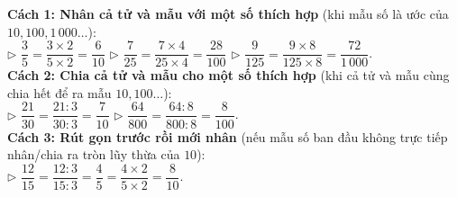 \documentclass[14pt,a4paper,oneside]{extbook}
\begin{document}
\vspace{3mm}

\noindent
\begin{tcolorbox}[
  enhanced,
  title={\footnotesize\bfseries\color{white}\faWrench\ 3. Cách chuyển một phân số thành phân số thập phân},
  colback=purple!2!white,
  colframe=purple!70!black,
  arc=2.5mm, boxrule=0.8pt, top=1.8mm, bottom=1.8mm, left=2.5mm, right=2.5mm
]
  \footnotesize
  \textbf{Cách 1: Nhân cả tử và mẫu với một số thích hợp} (khi mẫu số là ước của $10, 100, 1\,000\dots$):\\
  \quad $\triangleright$ $\dfrac{3}{5} = \dfrac{3 \times 2}{5 \times 2} = \dfrac{6}{10}$ \qquad $\triangleright$ $\dfrac{7}{25} = \dfrac{7 \times 4}{25 \times 4} = \dfrac{28}{100}$ \qquad $\triangleright$ $\dfrac{9}{125} = \dfrac{9 \times 8}{125 \times 8} = \dfrac{72}{1\,000}$.\\[2pt]
  \textbf{Cách 2: Chia cả tử và mẫu cho một số thích hợp} (khi cả tử và mẫu cùng chia hết để ra mẫu $10, 100\dots$):\\
  \quad $\triangleright$ $\dfrac{21}{30} = \dfrac{21 : 3}{30 : 3} = \dfrac{7}{10}$ \qquad $\triangleright$ $\dfrac{64}{800} = \dfrac{64 : 8}{800 : 8} = \dfrac{8}{100}$.\\[2pt]
  \textbf{Cách 3: Rút gọn trước rồi mới nhân} (nếu mẫu số ban đầu không trực tiếp nhân/chia ra tròn lũy thừa của $10$):\\
  \quad $\triangleright$ $\dfrac{12}{15} = \dfrac{12 : 3}{15 : 3} = \dfrac{4}{5} = \dfrac{4 \times 2}{5 \times 2} = \dfrac{8}{10}$.
\end{tcolorbox}

\vspace{3mm}
\end{document}
